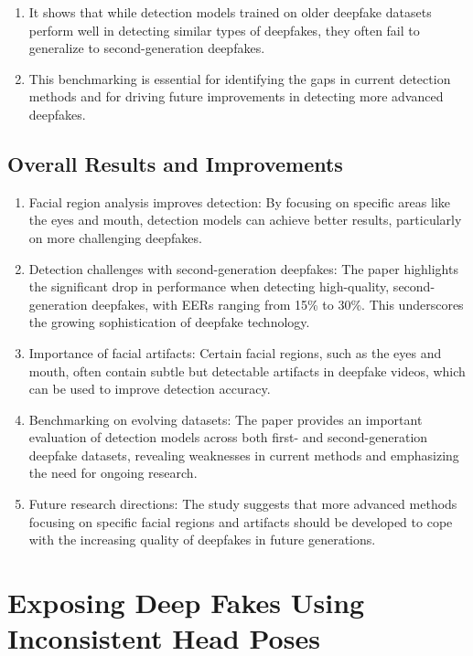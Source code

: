 \documentclass{report}
\begin{document}
	\begin{enumerate}
		\item 
		It shows that while detection models trained on older deepfake datasets perform well in detecting similar types of deepfakes, they often fail to generalize to second-generation deepfakes.
		
		\item 
		This benchmarking is essential for identifying the gaps in current detection methods and for driving future improvements in detecting more advanced deepfakes.
	\end{enumerate}
	
	
	
	\section{Overall Results and Improvements}
	\begin{enumerate}
		\item 
		Facial region analysis improves detection: By focusing on specific areas like the eyes and mouth, detection models can achieve better results, particularly on more challenging deepfakes.
		
		\item 
		Detection challenges with second-generation deepfakes: The paper highlights the significant drop in performance when detecting high-quality, second-generation deepfakes, with EERs ranging from 15\% to 30\%. This underscores the growing sophistication of deepfake technology.
		
		\item 
		Importance of facial artifacts: Certain facial regions, such as the eyes and mouth, often contain subtle but detectable artifacts in deepfake videos, which can be used to improve detection accuracy.
		
		\item 
		Benchmarking on evolving datasets: The paper provides an important evaluation of detection models across both first- and second-generation deepfake datasets, revealing weaknesses in current methods and emphasizing the need for ongoing research.
		
		\item 
		Future research directions: The study suggests that more advanced methods focusing on specific facial regions and artifacts should be developed to cope with the increasing quality of deepfakes in future generations.
	\end{enumerate}
	
	
	
	
	
	
	
	
	
	
	
	
	
	
	
	\chapter{Exposing Deep Fakes Using Inconsistent Head Poses \cite{DBLP:journals/corr/abs-1811-00661}}
	
	
	
	
	
	
	
	
	
	
	
	
	
	
	
	
	
	\newpage
	
	
	
\end{document}
